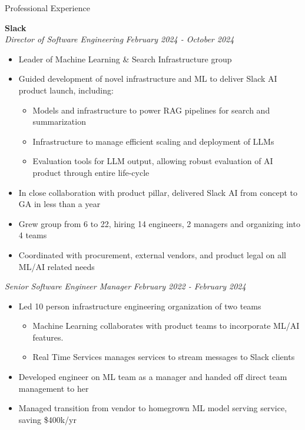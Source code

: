 \documentclass{resume} %
\begin{document}
\begin{rSection}{Professional Experience}

\vspace{0.2em}

{\bf Slack} \\
{\em Director of Software Engineering} \hfill {\em February 2024 - October 2024}  \vspace{0.1em} 
\begin{itemize} \itemsep -0.2em
    \item Leader of Machine Learning \& Search Infrastructure group
	\item Guided development of novel infrastructure and ML to deliver Slack AI product launch, including:
	\vspace{-0.2em}
        \begin{itemize} \itemsep -0.2em
            \item Models and infrastructure to power RAG pipelines for search and summarization
            \item Infrastructure to manage efficient scaling and deployment of LLMs
            \item Evaluation tools for LLM output, allowing robust evaluation of AI product through entire life-cycle
        \end{itemize}
    \item In close collaboration with product pillar, delivered Slack AI from concept to GA in less than a year
	\item Grew group from 6 to 22, hiring 14 engineers, 2 managers and organizing into 4 teams
    \item Coordinated with procurement, external vendors, and product legal on all ML/AI related needs
\end{itemize}

{\em Senior Software Engineer Manager} \hfill {\em February 2022 - February 2024}  \vspace{0.1em} 
\begin{itemize} \itemsep -0.2em
	\item Led 10 person infrastructure engineering organization of two teams
	\vspace{-0.2em}
        \begin{itemize} \itemsep -0.2em
            \item Machine Learning collaborates with product teams to incorporate ML/AI features.
            \item Real Time Services manages services to stream messages to Slack clients
        \end{itemize}
    \item Developed engineer on ML team as a manager and handed off direct team management to her
    \item Managed transition from vendor to homegrown ML model serving service, saving \$400k/yr
\end{itemize}


\end{rSection}
\end{document}
